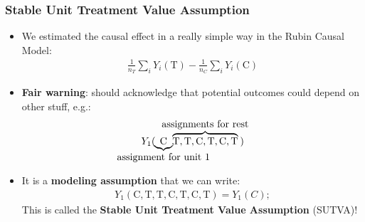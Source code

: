 \documentclass[aspectratio=169]{beamer}
\theoremstyle{principle}
\begin{document}
\begin{frame}
\frametitle{Stable Unit Treatment Value Assumption}
\begin{itemize}
\item We estimated the causal effect in a really simple way in the Rubin Causal Model:%
\begin{align*}
\frac{1}{n_T}\sum_iY_i(\mbox{T}) - \frac{1}{n_C}\sum_iY_i(\mbox{C})
\end{align*}
\item \textbf{Fair warning}: should acknowledge that potential outcomes could depend on other stuff, e.g.:
\begin{align*}
Y_1(\hspace{-13.5mm}\underbrace{\mbox{C}}_{\mbox{assignment for unit 1}}\hspace{-13.5mm},\hspace{-5mm}\overbrace{\mbox{T},\mbox{T},\mbox{C},\mbox{T},\mbox{C},\mbox{T}}^{\mbox{assignments for rest}}\hspace{-3mm})
\end{align*}
\item[]\color{white} It is a \textbf{modeling assumption} that we can write:
\begin{align*}
Y_1(\mbox{C},\mbox{T},\mbox{T},\mbox{C},\mbox{T},\mbox{C},\mbox{T}) = Y_1(C);
\end{align*}
This is called the \textbf{Stable Unit Treatment Value Assumption} (SUTVA)!
\end{itemize}
\end{frame}
\end{document}
